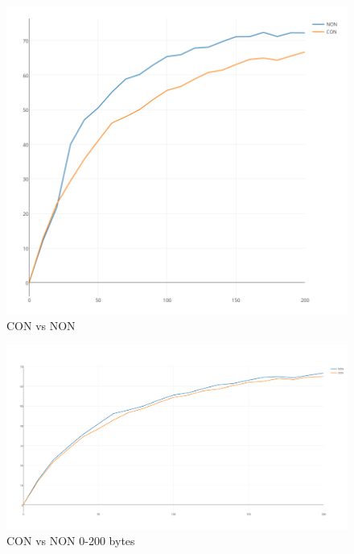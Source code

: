 \begin{figure}[ht]
    \centering
    \includegraphics[scale=0.45]{CONvsNON1.png}    
    \caption{CON vs NON}
    \label{fig:CONvsNON}
\end{figure}


\begin{figure}[ht]
    \centering
    \includegraphics[scale=0.35]{NONvsCON_0-200.png}    
    \caption{CON vs NON 0-200 bytes}
    \label{fig:CONvsNON0-200}
\end{figure}



